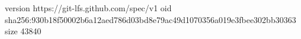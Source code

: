 version https://git-lfs.github.com/spec/v1
oid sha256:930b18f50002b6a12aed786d03bd8e79ac49d1070356a019e3fbee302bb30363
size 43840
